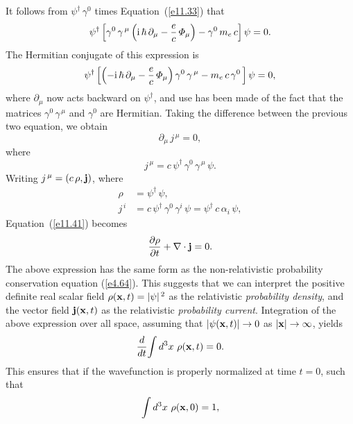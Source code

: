 It follows from $\psi^\dag\,\gamma^0$ times Equation~(\ref{e11.33}) that
\begin{equation}
\psi^\dag\left[\gamma^0\,\gamma^{\,\mu}\left({\rm i}\,\hbar\,\partial_\mu-\frac{e}{c}\,{\mit\Phi}_\mu\right)-\gamma^0\,m_e\,c\right]\psi=0.
\end{equation}
The Hermitian conjugate of this expression is 
\begin{equation}
\psi^\dag\left[\left(-{\rm i}\,\hbar\,\partial_\mu- \frac{e}{c}\,{\mit\Phi}_\mu\right)\gamma^0\,\gamma^{\,\mu}-m_e\,c\,\gamma^0\,\right]\psi=0,
\end{equation}
where $\partial_\mu$ now acts backward on $\psi^\dag$, and use has been made of the fact that the matrices $\gamma^0\,\gamma^{\,\mu}$
and $\gamma^0$ are Hermitian. Taking the difference between the previous two equation, we obtain
\begin{equation}\label{e11.41}
\partial_\mu\,j^{\,\mu} = 0,
\end{equation}
where
\begin{equation}\label{e11.42x}
j^{\,\mu} = c\,\psi^\dag\,\gamma^0\,\gamma^{\,\mu}\,\psi.
\end{equation}
Writing $j^{\,\mu} = (c\,\rho, {\bf j})$, where
\begin{align}
\rho &= \psi^\dag\,\psi,\\[0.5ex]
j^{\,i}& = c\,\psi^\dag\,\gamma^0\,\gamma^i\,\psi = \psi^\dag\,c\,\alpha_i\,\psi,
\end{align}
Equation~(\ref{e11.41}) becomes
\begin{equation}
\frac{\partial\rho}{\partial t} + \nabla\cdot{\bf j} = 0.
\end{equation}
The above expression has the same form as the non-relativistic probability conservation equation (\ref{e4.64}). This
suggests that we can interpret the positive definite real scalar field $\rho({\bf x},t) = |\psi|^{\,2}$ as the relativistic {\em probability density}, and the vector field ${\bf j}({\bf x},t)$
as the relativistic {\em probability current}. Integration of the above expression over all space, assuming that $|\psi({\bf x},t)|\rightarrow 0$ as $|{\bf x}|\rightarrow
\infty$, yields
\begin{equation}
\frac{d}{dt}\!\int d^3 x\,\,\rho({\bf x},t) = 0.
\end{equation}
This ensures that if the wavefunction  is properly normalized at time $t=0$, such that
\begin{equation}
\int d^3 x\,\,\rho({\bf x},0) = 1,
\end{equation}
